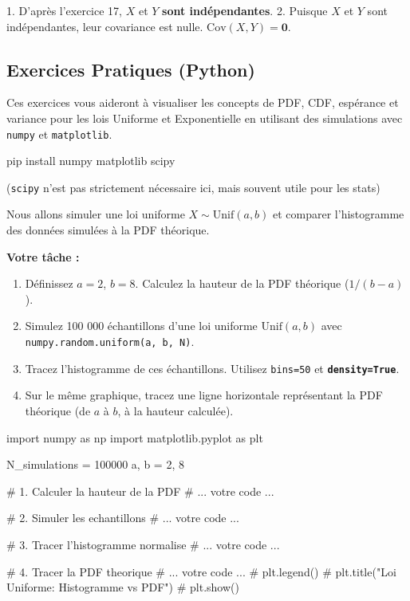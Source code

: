 \begin{correctionbox}
1.  D'après l'exercice 17, $X$ et $Y$ \textbf{sont indépendantes}.
2.  Puisque $X$ et $Y$ sont indépendantes, leur covariance est nulle.
    $\text{Cov}(X, Y) = \mathbf{0}$.
\end{correctionbox}

\subsection{Exercices Pratiques (Python)}

Ces exercices vous aideront à visualiser les concepts de PDF, CDF, espérance et variance pour les lois Uniforme et Exponentielle en utilisant des simulations avec \texttt{numpy} et \texttt{matplotlib}.

\begin{codecell}
pip install numpy matplotlib scipy
\end{codecell}
(\texttt{scipy} n'est pas strictement nécessaire ici, mais souvent utile pour les stats)

\begin{exercicebox}
Nous allons simuler une loi uniforme $X \sim \text{Unif}(a, b)$ et comparer l'histogramme des données simulées à la PDF théorique.

\textbf{Votre tâche :}
\begin{enumerate}
    \item Définissez $a=2$, $b=8$. Calculez la hauteur de la PDF théorique ($1 / (b-a)$).
    \item Simulez 100 000 échantillons d'une loi uniforme $\text{Unif}(a, b)$ avec \texttt{numpy.random.uniform(a, b, N)}.
    \item Tracez l'histogramme de ces échantillons. Utilisez \texttt{bins=50} et \textbf{\texttt{density=True}}.
    \item Sur le même graphique, tracez une ligne horizontale représentant la PDF théorique (de $a$ à $b$, à la hauteur calculée).
\end{enumerate}

\begin{codecell}
import numpy as np
import matplotlib.pyplot as plt

N_simulations = 100000
a, b = 2, 8

# 1. Calculer la hauteur de la PDF
# ... votre code ...

# 2. Simuler les echantillons
# ... votre code ...

# 3. Tracer l'histogramme normalise
# ... votre code ...

# 4. Tracer la PDF theorique
# ... votre code ...
# plt.legend()
# plt.title("Loi Uniforme: Histogramme vs PDF")
# plt.show()
\end{codecell}
\end{exercicebox}


